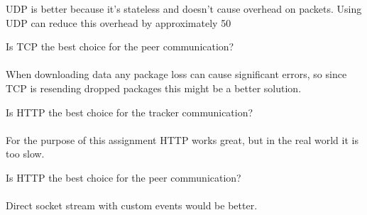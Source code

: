 \documentclass[a4paper,danish]{dnacm} %
\begin{document}
UDP is better because it's stateless and doesn't cause overhead on packets. Using UDP can reduce this overhead by approximately 50%

Is TCP the best choice for the peer communication?\\\\

When downloading data any package loss can cause significant errors, so since TCP is resending dropped packages this might be a better solution.

Is HTTP the best choice for the tracker communication?\\\\

For the purpose of this assignment HTTP works great, but in the real world it is too slow.

Is HTTP the best choice for the peer communication?\\\\

Direct socket stream with custom events would be better.
\end{document}
